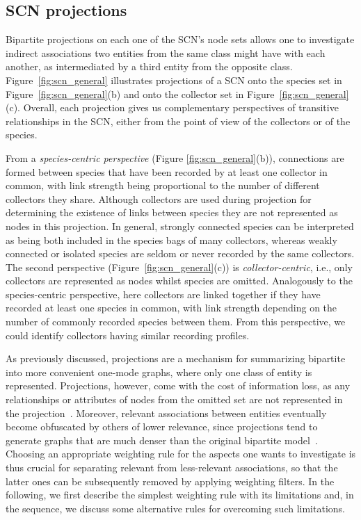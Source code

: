 {%

\subsection{SCN projections} \label{section:scn_projection}

Bipartite projections on each one of the SCN's node sets allows one to investigate indirect associations two entities from the same class might have with each another, as intermediated by a third entity from the opposite class. 
Figure~\ref{fig:scn_general} illustrates projections of a SCN onto the species set in Figure~\ref{fig:scn_general}(b) and onto the collector set in Figure~\ref{fig:scn_general}(c).
Overall, each projection gives us complementary perspectives of transitive relationships in the SCN, either from the point of view of the collectors or of the species.

From a \textit{species-centric perspective} (Figure \ref{fig:scn_general}(b)), connections are formed between species that have been recorded by at least one collector in common, with link strength being proportional to the number of different collectors they share. 
Although collectors are used during projection for determining the existence of links between species they are not represented as nodes in this projection.
In general, strongly connected species can be interpreted as being both included in the species bags of many collectors, whereas weakly connected or isolated species are seldom or never recorded by the same collectors.
The second perspective (Figure~\ref{fig:scn_general}(c)) is \textit{collector-centric}, i.e., only collectors are represented as nodes whilst species are omitted. 
Analogously to the species-centric perspective, here collectors are linked together if they have recorded at least one species in common, with link strength depending on the number of commonly recorded species between them. 
From this perspective, we could identify collectors having similar recording profiles.

As previously discussed, projections are a mechanism for summarizing bipartite into more convenient one-mode graphs, where only one class of entity is represented. 
Projections, however, come with the cost of information loss, as any relationships or attributes of nodes from the omitted set are not represented in the projection~\cite{Borgatti1997}. 
Moreover, relevant associations between entities eventually become obfuscated by others of lower relevance, since projections tend to generate graphs that are much denser than the original bipartite model~\cite{Lambiotte2005}.
Choosing an appropriate weighting rule for the aspects one wants to investigate is thus crucial for separating relevant from less-relevant associations, so that the latter ones can be subsequently removed by applying weighting filters.
In the following, we first describe the simplest weighting rule with its limitations and, in the sequence, we discuss some alternative rules for overcoming such limitations.

}

